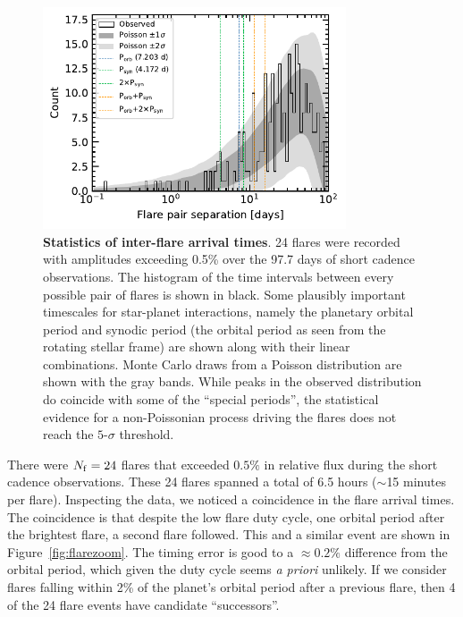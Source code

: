 \documentclass[12pt,modern,twocolumn,tighten]{aastex63}
\begin{document}
\begin{figure}[tp]
	\begin{center}
		\leavevmode
		\includegraphics[width=0.8\textwidth]{f15.pdf}
	\end{center}
	\vspace{-0.7cm}
	\caption{
		{\bf Statistics of inter-flare arrival times}.  
    24 flares were recorded with amplitudes exceeding 0.5\% over the
    97.7 days of short cadence observations.  The histogram of the
    time intervals between every possible pair of flares is shown in
    black.  Some plausibly important timescales for star-planet
    interactions, namely the planetary orbital period and synodic
    period (the orbital period as seen from the rotating stellar
    frame) are shown along with their linear combinations.  Monte
    Carlo draws from a Poisson distribution are shown with the gray
    bands.  While peaks in the observed distribution do coincide with
    some of the ``special periods'', the statistical evidence for a
    non-Poissonian process driving the flares does not reach the
    $5$-$\sigma$ threshold.
		\label{fig:flarestats}
	}
\end{figure}


There were $N_{\rm f}=24$ flares that exceeded $0.5\%$ in relative
flux during the short cadence observations.  These 24 flares spanned a
total of 6.5 hours ($\sim$15 minutes per flare).  Inspecting the data,
we noticed a coincidence in the flare arrival times.  The coincidence
is that despite the low flare duty cycle, one orbital period after the
brightest flare, a second flare followed.  This and a similar event
are shown in Figure~\ref{fig:flarezoom}.  The timing error is good to
a $\approx0.2\%$ difference from the orbital period, which given the
duty cycle seems {\it a priori} unlikely.  If we consider flares
falling within 2\% of the planet's orbital period after a previous
flare, then 4 of the 24 flare events have candidate ``successors''.
\end{document}
